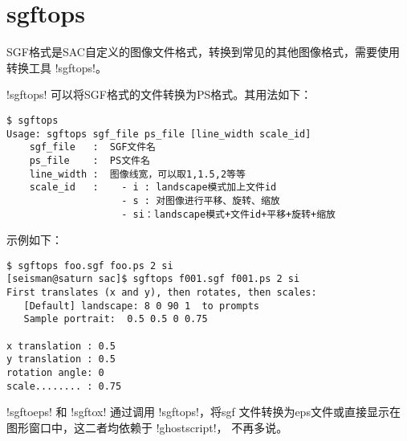 \section{sgftops}
\label{sec:sgftops}
\label{sec:sgftoeps}
\label{sec:sgftox}

SGF格式是SAC自定义的图像文件格式，转换到常见的其他图像格式，需要使用
转换工具 !sgftops!。

!sgftops! 可以将SGF格式的文件转换为PS格式。其用法如下：
\begin{verbatim}
$ sgftops
Usage: sgftops sgf_file ps_file [line_width scale_id]
    sgf_file   :  SGF文件名
    ps_file    :  PS文件名
    line_width :  图像线宽，可以取1,1.5,2等等
    scale_id   :    - i : landscape模式加上文件id
                    - s : 对图像进行平移、旋转、缩放
                    - si：landscape模式+文件id+平移+旋转+缩放
\end{verbatim}

示例如下：
\begin{verbatim}
$ sgftops foo.sgf foo.ps 2 si
[seisman@saturn sac]$ sgftops f001.sgf f001.ps 2 si
First translates (x and y), then rotates, then scales:
   [Default] landscape: 8 0 90 1  to prompts
   Sample portrait:  0.5 0.5 0 0.75

x translation : 0.5
y translation : 0.5
rotation angle: 0
scale........ : 0.75
\end{verbatim}

!sgftoeps! 和 !sgftox! 通过调用 !sgftops!，将sgf
文件转换为eps文件或直接显示在图形窗口中，这二者均依赖于 !ghostscript!，
不再多说。
